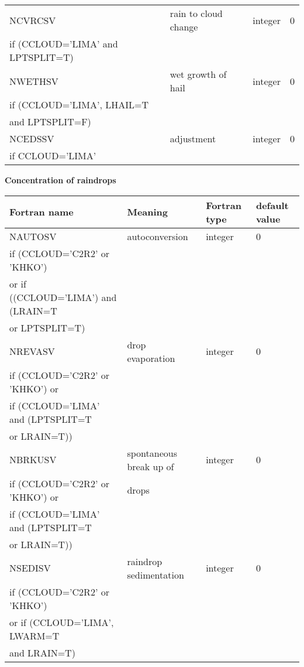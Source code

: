 \begin{longtable} {|p{}|p{}|>{\centering}p{}|p{}<{\centering}|}
NCVRCSV & rain to cloud change & integer & 0 \\ \nopagebreak
if (CCLOUD='LIMA' and LPTSPLIT=T)&&& \\\hline

NWETHSV & wet growth of hail& integer & 0 \\ \nopagebreak
if (CCLOUD='LIMA', LHAIL=T&&&\\ \nopagebreak
and LPTSPLIT=F)&&& \\\hline

NCEDSSV & adjustment & integer & 0 \\ \nopagebreak
if CCLOUD='LIMA' &&& \\\hline
\end{longtable}

\textbf{Concentration of raindrops}
\begin{longtable} {|p{}|p{}|>{\centering}p{}|p{}<{\centering}|}
\hline
Fortran name & Meaning & Fortran type & default value \\
\hline \hline
\endhead
NAUTOSV & autoconversion & integer & 0 \\ \nopagebreak
if (CCLOUD='C2R2' or 'KHKO') &&& \\ \nopagebreak
or if ((CCLOUD='LIMA') and (LRAIN=T &&& \\ \nopagebreak
or LPTSPLIT=T) &&& \\\hline

NREVASV & drop evaporation & integer & 0 \\ \nopagebreak
if (CCLOUD='C2R2' or 'KHKO') or &&& \\ \nopagebreak
if (CCLOUD='LIMA' and (LPTSPLIT=T &&& \\ \nopagebreak
or LRAIN=T)) &&& \\\hline

NBRKUSV & spontaneous break up of  & integer & 0 \\ \nopagebreak
if (CCLOUD='C2R2' or 'KHKO') or & drops && \\ \nopagebreak
if (CCLOUD='LIMA' and (LPTSPLIT=T &&& \\ \nopagebreak
or LRAIN=T)) &&& \\\hline

NSEDISV & raindrop sedimentation& integer & 0 \\ \nopagebreak
if (CCLOUD='C2R2' or 'KHKO') &&& \\ \nopagebreak
or if (CCLOUD='LIMA', LWARM=T &&& \\ \nopagebreak
and LRAIN=T) &&& \\\hline


\end{longtable}
